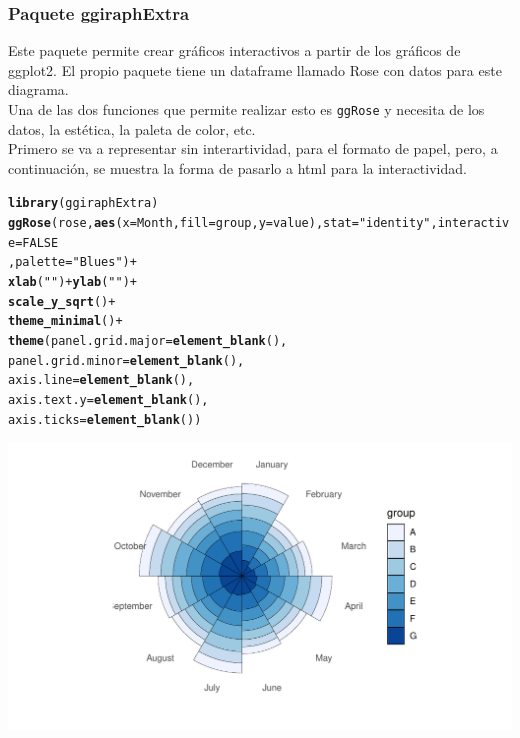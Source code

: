 \documentclass{article}\usepackage[]{graphicx}\usepackage[]{color}
\makeatletter
\def\maxwidth{ %
  \ifdim\Gin@nat@width>\linewidth
    \linewidth
  \else
    \Gin@nat@width
  \fi
}
\newcommand{\hlnum}[1]{\textcolor[rgb]{0.686,0.059,0.569}{#1}}%
\newcommand{\hlstr}[1]{\textcolor[rgb]{0.192,0.494,0.8}{#1}}%
\newcommand{\hlopt}[1]{\textcolor[rgb]{0,0,0}{#1}}%
\newcommand{\hlstd}[1]{\textcolor[rgb]{0.345,0.345,0.345}{#1}}%
\newcommand{\hlkwc}[1]{\textcolor[rgb]{0.333,0.667,0.333}{#1}}%
\newcommand{\hlkwd}[1]{\textcolor[rgb]{0.737,0.353,0.396}{\textbf{#1}}}%
\newenvironment{kframe}{%
 \def\at@end@of@kframe{}%
 \ifinner\ifhmode%
  \def\at@end@of@kframe{\end{minipage}}%
  \begin{minipage}{\columnwidth}%
 \fi\fi%
 \def\FrameCommand##1{\hskip\@totalleftmargin \hskip-\fboxsep
 \colorbox{shadecolor}{##1}\hskip-\fboxsep
     \hskip-\linewidth \hskip-\@totalleftmargin \hskip\columnwidth}%
 \MakeFramed {\advance\hsize-\width
   \@totalleftmargin\z@ \linewidth\hsize
   \@setminipage}}%
 {\par\unskip\endMakeFramed%
 \at@end@of@kframe}
\newenvironment{knitrout}{}{} %
\makeatother
\begin{document}
\subsubsection{Paquete ggiraphExtra}
Este paquete \cite{docu_ggiraphExtra}
permite crear gr\'aficos interactivos a partir de los gr\'aficos de ggplot2. El propio paquete tiene un dataframe llamado Rose con datos para este diagrama.~\\
Una de las dos funciones que permite realizar esto es \texttt{ggRose} y necesita de los datos, la est\'etica, la paleta de color, etc.~\\
Primero se va a representar sin interartividad, para el formato de papel, pero, a continuaci\'on, se muestra la forma de pasarlo a html para la interactividad.
\begin{knitrout}
\color{fgcolor}\begin{kframe}
\begin{alltt}
\hlkwd{library}\hlstd{(ggiraphExtra)}
\hlkwd{ggRose}\hlstd{(rose,}\hlkwd{aes}\hlstd{(}\hlkwc{x}\hlstd{=Month,}\hlkwc{fill}\hlstd{=group,}\hlkwc{y}\hlstd{=value),}\hlkwc{stat}\hlstd{=}\hlstr{"identity"}\hlstd{,}\hlkwc{interactive}\hlstd{=}\hlnum{FALSE}
       \hlstd{,} \hlkwc{palette} \hlstd{=} \hlstr{"Blues"}\hlstd{)} \hlopt{+}
   \hlkwd{xlab}\hlstd{(}\hlstr{""}\hlstd{)} \hlopt{+}  \hlkwd{ylab}\hlstd{(}\hlstr{""}\hlstd{)} \hlopt{+}
  \hlkwd{scale_y_sqrt}\hlstd{()} \hlopt{+}
  \hlkwd{theme_minimal}\hlstd{()} \hlopt{+}
  \hlkwd{theme}\hlstd{(}\hlkwc{panel.grid.major} \hlstd{=} \hlkwd{element_blank}\hlstd{(),}
        \hlkwc{panel.grid.minor} \hlstd{=} \hlkwd{element_blank}\hlstd{(),}
        \hlkwc{axis.line} \hlstd{=} \hlkwd{element_blank}\hlstd{(),}
        \hlkwc{axis.text.y} \hlstd{=} \hlkwd{element_blank}\hlstd{(),}
        \hlkwc{axis.ticks} \hlstd{=} \hlkwd{element_blank}\hlstd{())}
\end{alltt}
\end{kframe}

{\centering \includegraphics[width=\maxwidth]{figure/plot_rose_ggiraph-1} 

}



\end{knitrout}
\end{document}
